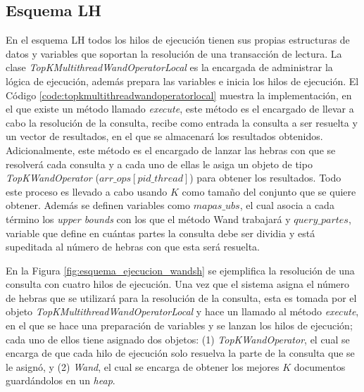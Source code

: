 \subsection{Esquema LH}
\label{evaluacionexperimental:esquemalh}
En el esquema LH todos los hilos de ejecución tienen sus propias estructuras de datos y variables que soportan la resolución de una transacción de lectura. La clase \textit{TopKMultithreadWandOperatorLocal} es la encargada de administrar la lógica de ejecución, además prepara las variables e inicia los hilos de ejecución. El Código \ref{code:topkmultithreadwandoperatorlocal} muestra la implementación, en el que existe un método llamado \textit{execute}, este método es el encargado de llevar a cabo la resolución de la consulta, recibe como entrada la consulta a ser resuelta y un vector de resultados, en el que se almacenará los resultados obtenidos. Adicionalmente, este método es el encargado de lanzar las hebras con que se resolverá cada consulta y a cada uno de ellas le asiga un objeto de tipo \textit{TopKWandOperator} ($arr\_ops[pid\_thread]$) para obtener los resultados. Todo este proceso es llevado a cabo usando $K$ como tamaño del conjunto que se quiere obtener. Además se definen variables como \textit{$mapas\_ubs$}, el cual asocia a cada término los \textit{upper bounds} con los que el método Wand trabajará y \textit{$query\_partes$}, variable que define en cuántas partes la consulta debe ser dividia y está supeditada al número de hebras con que esta será resuelta.



En la Figura \ref{fig:esquema_ejecucion_wandsh} se ejemplifica la resolución de una consulta con cuatro hilos de ejecución. Una vez que el sistema asigna el número de hebras que se utilizará para la resolución de la consulta, esta es tomada por el objeto \textit{TopKMultithreadWandOperatorLocal} y hace un llamado al método \textit{execute}, en el que se hace una preparación de variables y se lanzan los hilos de ejecución; cada uno de ellos tiene asignado dos objetos: (1) \textit{TopKWandOperator}, el cual se encarga de que cada hilo de ejecución solo resuelva la parte de la consulta que se le asignó, y (2) \textit{Wand}, el cual se encarga de obtener los mejores $K$ documentos guardándolos en un \textit{heap}.

